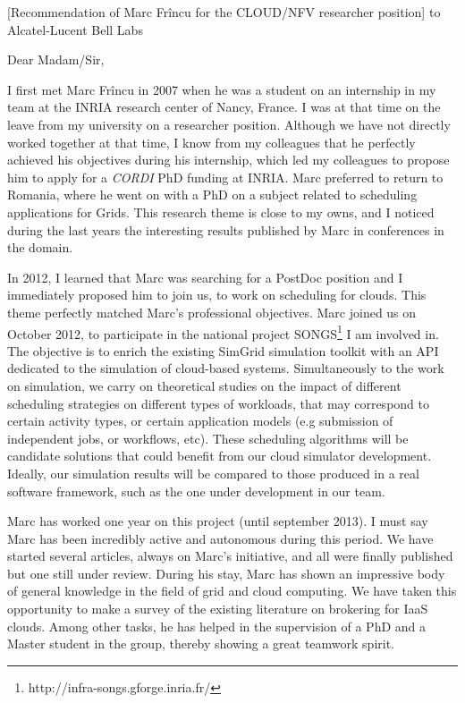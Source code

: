 \documentclass[a4paper,10pt]{article}
\begin{document}

\begin{letter}[Recommendation of Marc Fr\^incu for the CLOUD/NFV researcher
    position]
{to}
{Alcatel-Lucent Bell Labs}

Dear Madam/Sir, 

I first met Marc  Fr\^incu in 2007 when he was a student  on an internship in my
team at the  INRIA research center of Nancy,  France. I was at that  time on the
leave from my university on a researcher position. Although we have not directly
worked  together at  that time,  I  know from  my colleagues  that he  perfectly
achieved  his objectives  during  his  internship, which  led  my colleagues  to
propose him to apply for a \emph{CORDI}  PhD funding at INRIA. Marc preferred to
return  to Romania,  where  he  went on  with  a PhD  on  a  subject related  to
scheduling applications for Grids. This research  theme is close to my owns, and
I noticed  during the last  years the interesting  results published by  Marc in
conferences in the domain.

In  2012, I  learned  that Marc  was  searching  for a  PostDoc  position and  I
immediately proposed  him to  join us,  to work on  scheduling for  clouds. This
theme  perfectly  matched Marc's  professional  objectives.  Marc joined  us  on
October     2012,     to     participate     in     the     national     project
SONGS\footnote{http://infra-songs.gforge.inria.fr/}  I  am   involved  in.   The
objective  is to  enrich the  existing SimGrid  simulation toolkit  with an  API
dedicated to the  simulation of cloud-based systems. Simultaneously  to the work
on  simulation, we  carry  on theoretical  studies on  the  impact of  different
scheduling strategies  on different types  of workloads, that may  correspond to
certain  activity  types,  or  certain application  models  (e.g  submission  of
independent  jobs, or  workflows,  etc).  These  scheduling  algorithms will  be
candidate solutions  that could  benefit from  our cloud  simulator development.
Ideally, our  simulation results will  be compared to  those produced in  a real
software framework, such as the one under development in our team.

Marc has worked one year on this project (until september 2013). I must say Marc
has been  incredibly active and autonomous  during this period. We  have started
several articles,  always on Marc's  initiative, and all were  finally published
but one still under  review. During his stay, Marc has  shown an impressive body
of general  knowledge in the  field of grid and  cloud computing. We  have taken
this opportunity  to make a survey  of the existing literature  on brokering for
IaaS clouds.  Among other tasks, he has helped in the supervision of a PhD and a
Master student in the group, thereby showing a great teamwork spirit.



\end{letter}
\end{document}
